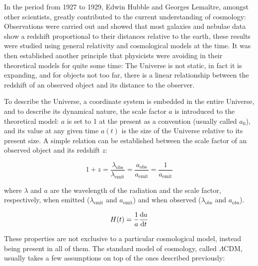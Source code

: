 \documentclass[openany,a4paper,12pt,oneside]{book}
\begin{document}
\begin{spacing}{1.5}

In the period from 1927 to 1929, Edwin Hubble and Georges Lemaître, amongst other scientists, greatly contributed to the current understanding of cosmology: Observations were carried out and showed that most galaxies and nebulae data show a redshift proportional to their distances relative to the earth\cite{hubble}, these results were studied using general relativity and cosmological models at the time\cite{Lemaitre:1927zz}. It was then established another principle that physicists were avoiding in their theoretical models for quite some time: The Universe is not static, in fact it is expanding, and for objects not too far, there is a linear relationship between the redshift of an observed object and its distance to the observer. 

To describe the Universe, a coordinate system is embedded in the entire Universe, and to describe its dynamical nature, the scale factor $a$ is introduced to the theoretical model: $a$ is set to 1 at the present as a convention (usually called $a_0$), and its value at any given time $a(t)$ is the size of the Universe relative to its present size. A simple relation can be established between the scale factor of an observed object and its redshift $z$:

\begin{equation}\label{1+z}
    1+z=\frac{\lambda_{\text{obs}}}{\lambda_\text{emit}}=\frac{a_\text{obs}}{a_\text{emit}}=\frac{1}{a_\text{emit}}
\end{equation}

\noindent where $\lambda$ and $a$ are the wavelength of the radiation and the scale factor, respectively, when emitted ($\lambda_\text{emit}$ and $a_\text{emit}$) and when observed ($\lambda_\text{obs}$ and $a_\text{obs}$).


\begin{equation}\label{def:H(t)}
    H(t)=\frac{1}{a}\dv{a}{t}
\end{equation}

These properties are not exclusive to a particular cosmological model, instead being present in all of them. The standard model of cosmology, called $\Lambda$CDM, usually takes a few assumptions on top of the ones described previously:


\end{spacing}
\end{document}
